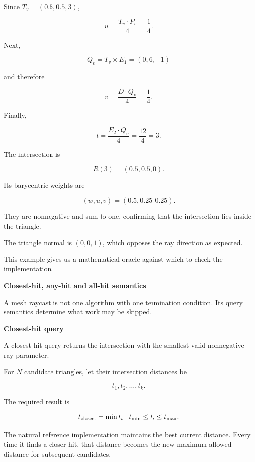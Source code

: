 Since \(T_v=(0.5,0.5,3)\),

\[
u=\frac{T_v\cdot P_v}{4}=\frac14.
\]

Next,

\[
Q_v=T_v\times E_1=(0,6,-1)
\]

and therefore

\[
v=\frac{D\cdot Q_v}{4}=\frac14.
\]

Finally,

\[
t=\frac{E_2\cdot Q_v}{4}=\frac{12}{4}=3.
\]

The intersection is

\[
R(3)=(0.5,0.5,0).
\]

Its barycentric weights are

\[
(w,u,v)=(0.5,0.25,0.25).
\]

They are nonnegative and sum to one, confirming that the intersection lies inside the triangle.

The triangle normal is \((0,0,1)\), which opposes the ray direction as expected.

This example gives us a mathematical oracle against which to check the implementation.

\textbf{Closest-hit, any-hit and all-hit semantics}

A mesh raycast is not one algorithm with one termination condition. Its query semantics determine what work may be skipped.

\textbf{Closest-hit query}

A closest-hit query returns the intersection with the smallest valid nonnegative ray parameter.

For \(N\) candidate triangles, let their intersection distances be

\[
t_1,t_2,\ldots,t_k.
\]

The required result is

\[
t_{\text{closest}}=\min\\{t_i\mid t_{\min}\leq t_i\leq t_{\max}\\}.
\]

The natural reference implementation maintains the best current distance. Every time it finds a closer hit, that distance becomes the new maximum allowed distance for subsequent candidates.

